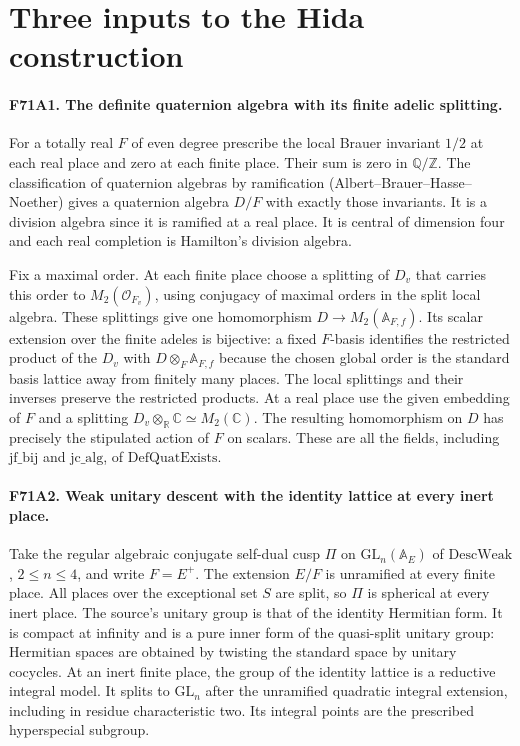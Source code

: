 \section{Three inputs to the Hida construction}

\paragraph{F71A1. The definite quaternion algebra with its finite adelic splitting.}
For a totally real $F$ of even degree prescribe the local Brauer
invariant $1/2$ at each real place and zero at each finite place.
Their sum is zero in $\mathbb Q/\mathbb Z$. The classification
of quaternion algebras by ramification (Albert--Brauer--Hasse--Noether)
gives a quaternion algebra $D/F$ with exactly those invariants.
It is a division algebra since it is ramified at a real place.
It is central of dimension four and each real completion is
Hamilton's division algebra.

Fix a maximal order. At each finite place choose a splitting of
$D_v$ that carries this order to $M_2(\mathcal O_{F_v})$, using
conjugacy of maximal orders in the split local algebra. These
splittings give one homomorphism $D\to M_2(\mathbb A_{F,f})$.
Its scalar extension over the finite adeles is bijective: a fixed
$F$-basis identifies the restricted product of the $D_v$ with
$D\otimes_F\mathbb A_{F,f}$ because the chosen global order is
the standard basis lattice away from finitely many places. The
local splittings and their inverses preserve the restricted
products. At a real place use the given embedding of $F$ and a
splitting $D_v\otimes_{\mathbb R}\mathbb C\simeq M_2(\mathbb C)$.
The resulting homomorphism on $D$ has precisely the stipulated
action of $F$ on scalars. These are all the fields, including
$\mathrm{jf\_bij}$ and $\mathrm{jc\_alg}$, of
$\mathrm{DefQuatExists}$.

\paragraph{F71A2. Weak unitary descent with the identity lattice at every inert place.}
Take the regular algebraic conjugate self-dual cusp $\Pi$ on
$\mathrm{GL}_n(\mathbb A_E)$ of $\mathrm{DescWeak}$, $2\le n\le4$,
and write $F=E^+$. The extension $E/F$ is unramified at every
finite place. All places over the exceptional set $S$ are split,
so $\Pi$ is spherical at every inert place. The source's unitary
group is that of the identity Hermitian form. It is compact at
infinity and is a pure inner form of the quasi-split unitary
group: Hermitian spaces are obtained by twisting the standard
space by unitary cocycles. At an inert finite place, the group
of the identity lattice is a reductive integral model. It splits
to $\mathrm{GL}_n$ after the unramified quadratic integral
extension, including in residue characteristic two. Its integral
points are the prescribed hyperspecial subgroup.


